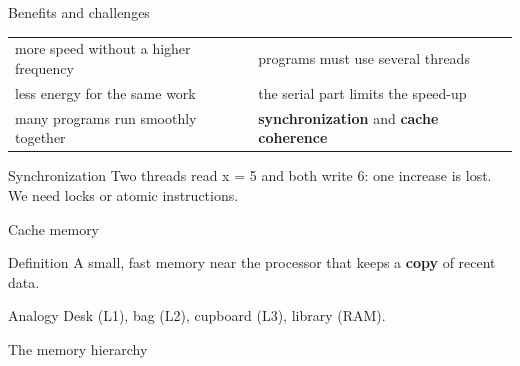 \documentclass[aspectratio=169, 11pt, t, xcolor={table}]{beamer}
\begin{document}
\begin{frame}{Benefits and challenges}
    \begin{center}
    \small
    \begin{tabularx}{0.95\linewidth}{|L|L|}
        \hline {} &  \\ \hline
        more speed without a higher frequency & programs must use several threads \\ \hline
        less energy for the same work & the serial part limits the speed-up \\ \hline
        many programs run smoothly together & \textbf{synchronization} and \textbf{cache coherence} \\ \hline
    \end{tabularx}
    \end{center}
    \begin{obox}{\faExclamationTriangle\quad Synchronization}
        Two threads read x = 5 and both write 6: one increase is lost. We need locks or atomic instructions.
    \end{obox}
\end{frame}

\begin{frame}{Cache memory}
    \begin{tbox}{\faLightbulb\quad Definition}
        A small, fast memory near the processor that keeps a \textbf{copy} of recent data.
    \end{tbox}
    \begin{pbox}{\faSmile\quad Analogy}
        Desk (L1), bag (L2), cupboard (L3), library (RAM).
    \end{pbox}
\end{frame}

\begin{frame}{The memory hierarchy}
    \begin{center}
    \end{center}
\end{frame}
\end{document}
